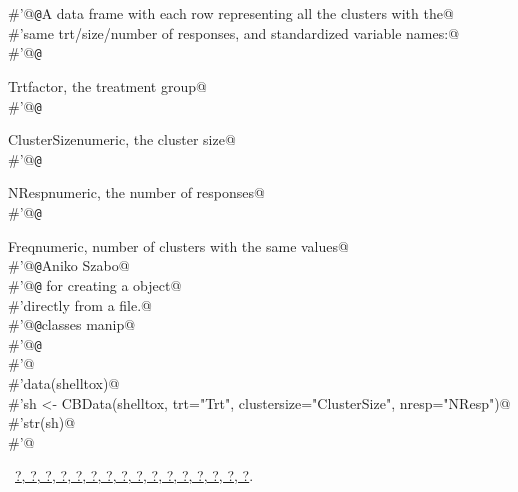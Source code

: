 \documentclass[reqno]{amsart}
\renewcommand{\NWlink}[2]{\hyperlink{#1}{#2}}
\begin{document}
\begin{flushleft}
\begin{list}{}{}
\mbox{}\verb@#'@{\tt @}\verb@return A data frame with each row representing all the clusters with the@\\
\mbox{}\verb@#'same trt/size/number of responses, and standardized variable names:@\\
\mbox{}\verb@#'@{\tt @}\verb@return \item{Trt}{factor, the treatment group}@\\
\mbox{}\verb@#'@{\tt @}\verb@return \item{ClusterSize}{numeric, the cluster size}@\\
\mbox{}\verb@#'@{\tt @}\verb@return \item{NResp}{numeric, the number of responses}@\\
\mbox{}\verb@#'@{\tt @}\verb@return \item{Freq}{numeric, number of clusters with the same values}@\\
\mbox{}\verb@#'@{\tt @}\verb@author Aniko Szabo@\\
\mbox{}\verb@#'@{\tt @}\verb@seealso {} for creating a  object@\\
\mbox{}\verb@#'directly from a file.@\\
\mbox{}\verb@#'@{\tt @}\verb@keywords classes manip@\\
\mbox{}\verb@#'@{\tt @}\verb@examples@\\
\mbox{}\verb@#'@\\
\mbox{}\verb@#'data(shelltox)@\\
\mbox{}\verb@#'sh <- CBData(shelltox, trt="Trt", clustersize="ClusterSize", nresp="NResp")@\\
\mbox{}\verb@#'str(sh)@\\
\mbox{}\verb@#'@\\
\mbox{}\verb@@{\NWsep}
\end{list}
\vspace{-1.5ex}
\footnotesize
\begin{list}{}{\setlength{\itemsep}{-\parsep}\setlength{\itemindent}{-\leftmargin}}
\item \NWtxtFileDefBy\ \NWlink{nuweb?}{?}\NWlink{nuweb?}{, ?}\NWlink{nuweb?}{, ?}\NWlink{nuweb?}{, ?}\NWlink{nuweb?}{, ?}\NWlink{nuweb?}{, ?}\NWlink{nuweb?}{, ?}\NWlink{nuweb?}{, ?}\NWlink{nuweb?}{, ?}\NWlink{nuweb?}{, ?}\NWlink{nuweb?}{, ?}\NWlink{nuweb?}{, ?}\NWlink{nuweb?}{, ?}\NWlink{nuweb?}{, ?}\NWlink{nuweb?}{, ?}\NWlink{nuweb?}{, ?}.

\item{}
\end{list}
\vspace{4ex}
\end{flushleft}
\end{document}

